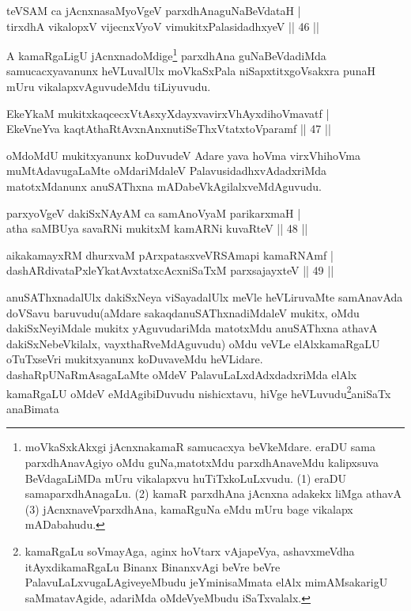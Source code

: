 \begin{shl}
teVSAM ca jAcnxnasaMyoVgeV parxdhAnaguNaBeVdataH |\\
tirxdhA vikalopxV vijecnxVyoV vimukitxPalasidadhxyeV \hfill || 46 ||
\end{shl}

\begin{artha}
A kamaRgaLigU jAcnxnadoMdige\footnote{moVkaSxkAkxgi jAcnxnakamaR samucacxya beVkeMdare. eraDU sama parxdhAnavAgiyo oMdu guNa,matotxMdu parxdhAnaveMdu kalipxsuva BeVdagaLiMDa mUru vikalapxvu huTiTxkoLuLxvudu. (1) eraDU samaparxdhAnagaLu. (2) kamaR parxdhAna jAcnxna adakekx liMga athavA (3) jAcnxnaveVparxdhAna, kamaRguNa eMdu mUru bage vikalapx mADabahudu.} parxdhAna guNaBeVdadiMda samucacxyavanunx heVLuvalUlx moVkaSxPala niSapxtitxgoVsakxra punaH mUru vikalapxvAguvudeMdu tiLiyuvudu.
\end{artha}


\begin{shl}
EkeYkaM mukitxkaqcecxVtAsxyXdayxvavirxVhAyxdihoVmavatf |\\
EkeVneYva kaqtAthaRtAvxnAnxnutiSeThxVtatxtoV\s paramf \hfill || 47 ||
\end{shl}

\begin{artha}
oMdoMdU mukitxyanunx koDuvudeV Adare yava hoVma virxVhihoVma muMtAdavugaLaMte oMdariMdaleV PalavusidadhxvAdadxriMda matotxMdanunx anuSAThxna mADabeVkAgilalxveMdAguvudu.
\end{artha}

\begin{shl}
parxyoVgeV dakiSxNAyAM ca samAnoV\s yaM parikarxmaH |\\
atha saMBUya savaRNi mukitxM kamARNi kuvaRteV \hfill || 48 ||
\end{shl}

\begin{shl}
aikakamayxRM dhurxvaM pArxpatasxveVRSAmapi kamaRNAmf |\\
dashARdivataPxleYkatAvxtatxcAcxniSaTxM parxsajayxteV \hfill || 49 ||
\end{shl}

\begin{artha}
anuSAThxnadalUlx dakiSxNeya viSayadalUlx meVle heVLiruvaMte samAnavAda doVSavu baruvudu(aMdare sakaqdanuSAThxnadiMdaleV mukitx, oMdu dakiSxNeyiMdale mukitx yAguvudariMda matotxMdu anuSAThxna athavA dakiSxNebeVkilalx, vayxthaRveMdAguvudu) oMdu veVLe elAlxkamaRgaLU oTuTxseVri mukitxyanunx koDuvaveMdu heVLidare. dashaRpUNaRmAsagaLaMte oMdeV PalavuLaLxdAdxdadxriMda elAlx kamaRgaLU oMdeV eMdAgibiDuvudu nishicxtavu, hiVge heVLuvudu\footnote{kamaRgaLu soVmayAga, aginx hoVtarx vAjapeVya, ashavxmeVdha itAyxdikamaRgaLu Binanx BinanxvAgi beVre beVre PalavuLaLxvugaLAgiveyeMbudu jeYminisaMmata elAlx mimAMsakarigU saMmatavAgide, adariMda oMdeVyeMbudu iSaTxvalalx.}aniSaTx anaBimata   
\end{artha}

